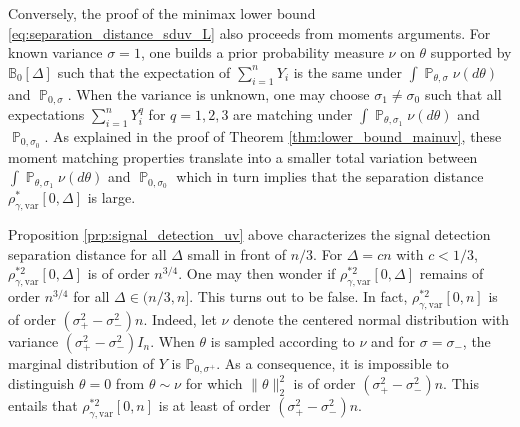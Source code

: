 \documentclass[twoside,11pt]{article}
\def\bbB{\mathbb{B}}
\def\bbP{\mathbb{P}}
\renewcommand{\P}{\operatorname{\mathbb{P}}}
\newcommand{\<}{\langle}
\renewcommand{\>}{\rangle}
\begin{document}
Conversely, the proof of the minimax lower bound \eqref{eq:separation_distance_sduv_L} also proceeds from moments arguments. For known variance $\sigma=1$, one builds a prior probability measure $\nu$ on $\theta$ supported by $\bbB_0[\Delta]$ such that the expectation of $\sum_{i=1}^n Y_i$ is the same under $\int \P_{\theta,\sigma}\nu(d \theta)$ and $\P_{0,\sigma}$. When the variance is unknown, one may choose $\sigma_1\neq \sigma_0$ such that all 
 expectations $\sum_{i=1}^n Y^q_i$ for $q=1,2,3$ are matching under $\int \P_{\theta,\sigma_1}\nu(d \theta)$ and $\P_{0,\sigma_0}$. As explained in the proof of Theorem \ref{thm:lower_bound_mainuv}, these moment matching properties translate into a smaller total variation between $\int \P_{\theta,\sigma_1}\nu(d \theta)$ and $\P_{0,\sigma_0}$ which in turn implies that the separation distance $ \rho^{*}_{\gamma,\mathrm{var}}[0,\Delta]$ is large. 


 

 






\bigskip 


Proposition \ref{prp:signal_detection_uv} above characterizes the signal detection separation distance for all $\Delta$ small in front of $n/3$. For $\Delta= c n$ with $c<1/3$, $\rho_{\gamma,\mathrm{var}}^{*2}[0,\Delta]$ is of order $n^{3/4}$. One may then wonder if $\rho_{\gamma,\mathrm{var}}^{*2}[0,\Delta]$ remains of order $n^{3/4}$ for all $\Delta \in (n/3,n]$. This turns out to be false. In fact, $\rho_{\gamma,\mathrm{var}}^{*2}[0,n]$ is of order $(\sigma^2_+-\sigma^2_-)n$. Indeed, let $\nu$ denote the centered normal distribution with  variance $(\sigma^2_+-\sigma_-^2)I_n$. When $\theta$ is sampled according to $\nu$ and for $\sigma=\sigma_-$, the marginal distribution of $Y$ is $\bbP_{0,\sigma^+}$. As a consequence, it is impossible to distinguish $\theta=0$ from $\theta\sim \nu$ for which $\|\theta\|_2^2$  is of order $(\sigma^2_+-\sigma^2_-)n$. This entails that $\rho_{\gamma,\mathrm{var}}^{*2}[0,n]$ is at least of order $(\sigma^2_+-\sigma^2_-)n$. 
\end{document}
